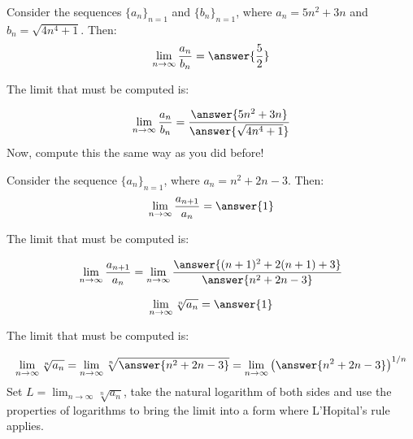 \documentclass{ximera}
\author{Jim Talamo}
\begin{document}
\begin{exercise}

Consider the sequences $\{a_n \}_{n=1}$ and $\{b_n \}_{n=1}$, where $a_n =5n^2+3n$ and $b_n = \sqrt{4n^4+1}$.  Then:
\[
\lim_{n \to \infty} \frac{a_n}{b_n} = \answer{\frac{5}{2}}
\]

\begin{hint}
The limit that must be computed is:

\[
\lim_{n \to \infty} \frac{a_n}{b_n} = \frac{\answer{5n^2+3n}}{\answer{\sqrt{4n^4+1}}}
\]
Now, compute this the same way as you did before!
\end{hint}

\end{exercise}

Consider the sequence $\{a_n \}_{n=1}$, where $a_n =n^2+2n-3$.  Then:
\[
\lim_{n \to \infty} \frac{a_{n+1}}{a_n} = \answer{1}
\]

\begin{hint}
The limit that must be computed is:

\[
\lim_{n \to \infty} \frac{a_{n+1}}{a_n} = \lim_{n \to \infty} \frac{\answer{(n+1)^2+2(n+1)+3}}{\answer{n^2+2n-3}}
\]

\end{hint}

\[
\lim_{n \to \infty} \sqrt[n]{a_n} = \answer{1}
\]
\begin{hint}
The limit that must be computed is:

\[
\lim_{n \to \infty} \sqrt[n]{a_n} = \lim_{n \to \infty} \sqrt[n]{\answer{n^2+2n-3}} =  \lim_{n \to \infty} \left(\answer{n^2+2n-3}\right)^{1/n}
\]
Set $L = \lim_{n \to \infty} \sqrt[n]{a_n}$, take the natural logarithm of both sides and use the properties of logarithms to bring the limit into a form where L'Hopital's rule applies.
\end{hint}
\end{document}
